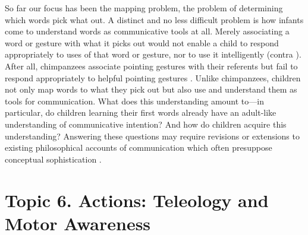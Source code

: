 \documentclass[12pt,\papersize]{extarticle}
\begin{document}
So far our focus has been the mapping problem, the problem of determining which words pick what out. 
A distinct and no less difficult problem is how infants come to understand words as communicative tools at all.
Merely associating a word or gesture with what it picks out would not enable a child to respond appropriately to uses of that word or gesture, nor to use it intelligently (contra \citealp[p.\ 75]{Russell:1921ww}).
After all, chimpanzees associate pointing gestures with their referents \citep[][p.\ 6]{Moll:2007gu} but fail to respond appropriately to helpful pointing gestures \citep{hare_chimpanzees_2004}. 
Unlike chimpanzees, children not only map words to what they pick out but also use and understand them as tools for communication. 
What does this understanding amount to---in particular, do children learning their first words already have an adult-like understanding of communicative intention?  And how do children acquire this understanding?
Answering these questions may require revisions or extensions to existing philosophical accounts of communication which often presuppose conceptual sophistication \citep[e.g.][]{Grice:1957kg}.




\section{Topic 6. Actions: Teleology and Motor Awareness}
\end{document}
